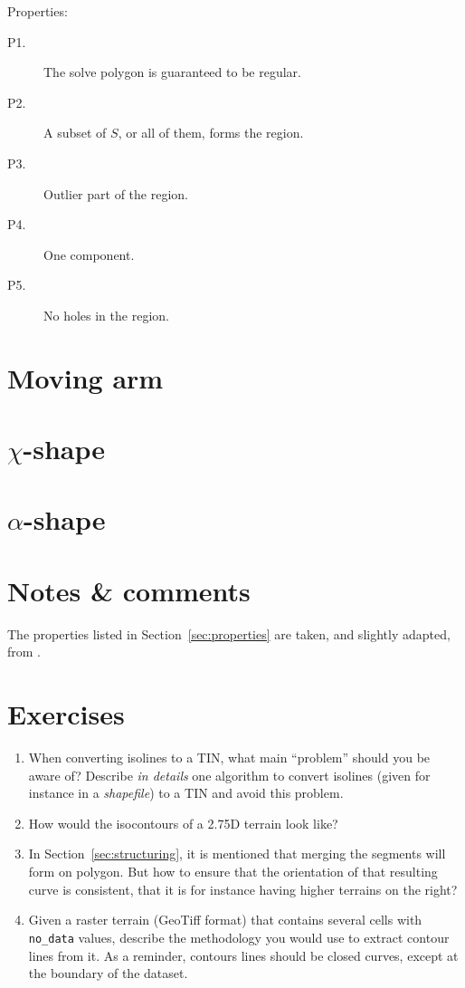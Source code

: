 %
Properties:
\begin{description}
  \item[P1.] The solve polygon is guaranteed to be regular. 
  \item[P2.] A subset of $S$, or all of them, forms the region.
  \item[P3.] Outlier part of the region.
  \item[P4.] One component. 
  \item[P5.] No holes in the region. 
\end{description}



%
\section{Moving arm}


%
\section{$\chi$-shape}

%
\section{$\alpha$-shape}

%
\section{Notes \& comments}

The properties listed in Section~\ref{sec:properties} are taken, and slightly adapted, from \citet{Galton06}. 


%
\section{Exercises}

\begin{enumerate}
  \item When converting isolines to a TIN, what main ``problem'' should you be aware of? Describe \emph{in details} one algorithm to convert isolines (given for instance in a \emph{shapefile}) to a TIN and avoid this problem.
  \item How would the isocontours of a 2.75D terrain look like?
  \item In Section~\ref{sec:structuring}, it is mentioned that merging the segments will form on polygon. But how to ensure that the orientation of that resulting curve is consistent, that it is for instance having higher terrains on the right?
  \item Given a raster terrain (GeoTiff format) that contains several cells with \texttt{no\_data} values, describe the methodology you would use to extract contour lines from it. As a reminder, contours lines should be closed curves, except at the boundary of the dataset.
\end{enumerate}